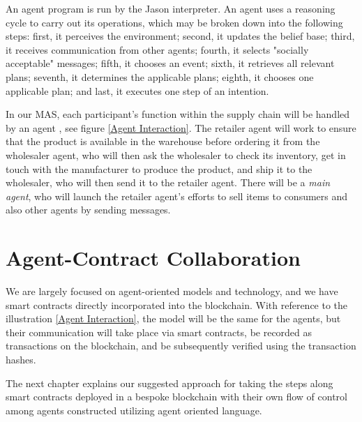 An agent program is run by the Jason interpreter. An agent uses a reasoning cycle to carry out its operations, which may be broken down into the following steps: first, it perceives the environment; second, it updates the belief base; third, it receives communication from other agents; fourth, it selects "socially acceptable" messages; fifth, it chooses an event; sixth, it retrieves all relevant plans; seventh, it determines the applicable plans; eighth, it chooses one applicable plan; and last, it executes one step of an intention.

\vspace{.5cm}

In our \ac{MAS}, each participant's function within the supply chain will be handled by an agent , see figure \ref{Agent Interaction}. The retailer agent will work to ensure that the product is available in the warehouse before ordering it from the wholesaler agent, who will then ask the wholesaler to check its inventory, get in touch with the manufacturer to produce the product, and ship it to the wholesaler, who will then send it to the retailer agent. There will be a \textit{main agent}, who will launch the retailer agent's efforts to sell items to consumers and also other agents by sending messages.

\section{Agent-Contract Collaboration}

 
 We are largely focused on agent-oriented models and technology, and we have smart contracts directly incorporated into the blockchain. With reference to the illustration \ref{Agent Interaction}, the model will be the same for the agents, but their communication will take place via smart contracts, be recorded as transactions on the blockchain, and be subsequently verified using the transaction hashes.
 
 \vspace{.5cm}
 
The next chapter explains our suggested approach for taking the steps along smart contracts deployed in a bespoke blockchain with their own flow of control among agents constructed utilizing agent oriented language.